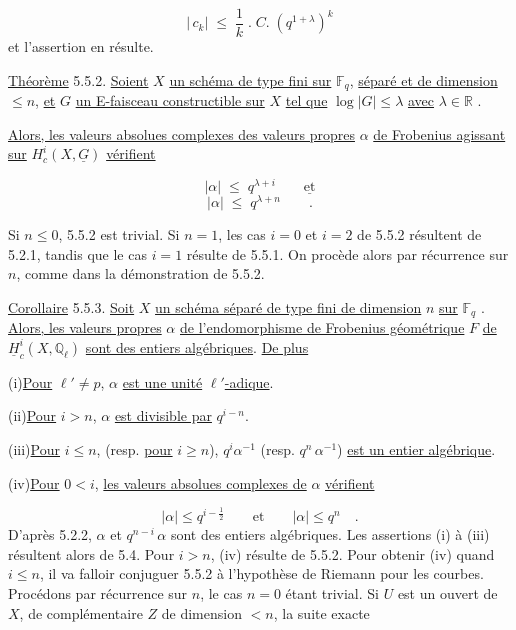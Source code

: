 \begin{equation*}
\left| \, c_k \right| \;\leqslant\; \frac{1}{k} \;.\; C. \; (q^{1+\lambda})^k
\end{equation*}
et l'assertion en résulte.

\underline{Théorème} 5.5.2. \underline{Soient} $X$ \underline{un schéma de type fini sur} $\mathbb{F}_q$, \underline{séparé et de dimension} $\leqslant n$, \underline{et} $G$ \underline{un E-faisceau constructible sur} $X$ \underline{tel que} $\log|G| \leqslant \lambda$ \underline{avec} $\lambda \in \mathbb{R}$ .

\underline{Alors, les valeurs absolues complexes des valeurs propres} $\alpha$ \underline{de Frobenius agissant sur} $H^i_c(X,\underline{G})$ \underline{vérifient}

\begin{equation*}
|\alpha| \;\leqslant\; q^{\lambda+i} \qquad \underline{\mbox{et}}
\end{equation*}
\begin{equation*}
|\alpha| \;\leqslant\; q^{\lambda+n} \qquad .
\end{equation*}


Si $n \leq 0$, 5.5.2 est trivial. Si $n = 1$, les cas $i = 0$ et $i = 2$ de 5.5.2 résultent de 5.2.1, tandis que le cas $i = 1$ résulte de 5.5.1. On procède alors par récurrence sur $n$, comme dans la démonstration de 5.5.2.

\underline{Corollaire} 5.5.3. \underline{Soit} $X$ \underline{un schéma séparé de type fini de dimension} $n$ \underline{sur} $\mathbb{F}_q$ . \underline{Alors, les valeurs propres} $\alpha$ \underline{de l'endomorphisme de Frobenius géométrique} $F$ \underline{de} $\underline{H}^i_c(X,\mathbb{Q}_\ell)$ \underline{sont des entiers algébriques}. \underline{De plus}

(i)\quad \underline{Pour} $\ell' \neq p$, $\alpha$ \underline{est une unité} $\ell'$\underline{-adique}.

(ii)\quad \underline{Pour} $i > n$, $\alpha$ \underline{est divisible par} $q^{i-n}$.

(iii)\quad \underline{Pour} $i \leq n$, (resp. \underline{pour} $i \geq n$), $q^i \alpha^{-1}$ (resp. $q^n \, \alpha^{-1}$) \underline{est un entier algébrique}.

(iv)\quad \underline{Pour} $0 < i$, \underline{les valeurs absolues complexes de} $\alpha$ \underline{vérifient}

\begin{equation*}
|\alpha| \leq q^{i-\frac{1}{2}} \qquad \mathrm{et} \qquad |\alpha| \leq q^n \quad .
\end{equation*}
D'après 5.2.2, $\alpha$ et $q^{n-i} \, \alpha$ sont des entiers algébriques. Les assertions (i) à (iii) résultent alors de 5.4. Pour $i > n$, (iv) résulte de 5.5.2. Pour obtenir (iv) quand $i \leq n$, il va falloir conjuguer 5.5.2 à l'hypothèse de Riemann pour les courbes. Procédons par récurrence sur $n$, le cas $n = 0$ étant trivial. Si $U$ est un ouvert de $X$, de complémentaire $Z$ de dimension $< n$, la suite exacte

